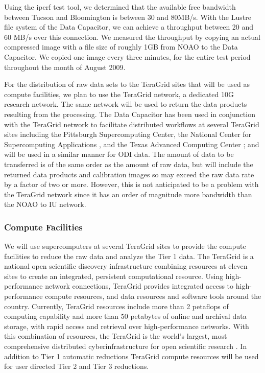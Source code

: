 \documentclass[10pt,conference]{IEEEtran}
\begin{document}
Using the iperf test tool, we determined that the available free bandwidth between Tucson
and Bloomington is between 30 and 80MB/s. With the Lustre file system of the Data Capacitor,
we can achieve a throughput between 20 and 60 MB/s over this connection. We measured
the throughput by copying an actual compressed image with a file size of roughly 1GB from NOAO to
the Data Capacitor. We copied one image every three minutes, for the entire test period throughout the month of August 2009.

For the distribution of raw data sets to the TeraGrid sites that will be used as compute facilities, we plan to use the TeraGrid network, a dedicated 10G research network. The same network will be used to return the data products resulting from the processing. The Data Capacitor has been used in conjunction with the TeraGrid network to facilitate distributed workflows at several TeraGrid sites including the Pittsburgh Supercomputing Center, the National Center for Supercomputing Applications \cite{henschel2010}, and the Texas Advanced Computing Center \cite{horowitz2010}; and will be used in a similar manner for ODI data. The amount of data to be transferred is of the same order as the amount of raw data, but will include the returned data products and calibration images so may exceed the raw data rate by a factor of two or more. However, this is not anticipated to be a problem with the TeraGrid network since it has an order of magnitude more bandwidth than the NOAO to IU network.

\subsubsection{Compute Facilities}

We will use supercomputers at several TeraGrid sites to provide the compute facilities to reduce the raw data and analyze the Tier 1 data. The TeraGrid is a national open scientific discovery infrastructure combining resources at eleven sites to create an integrated, persistent computational resource. Using high-performance network connections, TeraGrid provides integrated access to high-performance compute resources, and data resources and software tools around the country. Currently, TeraGrid resources include more than 2 petaflops of computing capability and more than 50 petabytes of online and archival data storage, with rapid access and retrieval over high-performance networks. With this combination of resources, the TeraGrid is the world's largest, most comprehensive distributed cyberinfrastructure for open scientific research \cite{teragrid}. In addition to Tier 1 automatic reductions TeraGrid compute resources will be used for user directed Tier 2 and Tier 3 reductions.
\end{document}
